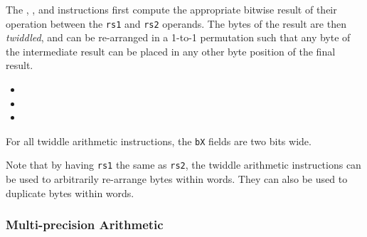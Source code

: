 The , , and  instructions first compute the
appropriate bitwise result of their operation between the {\tt rs1} and
{\tt rs2} operands. The bytes of the result are then {\em twiddled}, and
can be re-arranged in a 1-to-1 permutation such that any byte of the
intermediate result can be placed in any other byte position of the final
result.

\begin{itemize}
\item {}
\item {}
\item {}
\end{itemize}

For all twiddle arithmetic instructions, the {\tt bX} fields are two bits
wide.

Note that by having {\tt rs1} the same as {\tt rs2}, the twiddle
arithmetic instructions can be used to arbitrarily re-arrange bytes
within words. They can also be used to duplicate bytes within words.

\subsubsection{Multi-precision Arithmetic}
